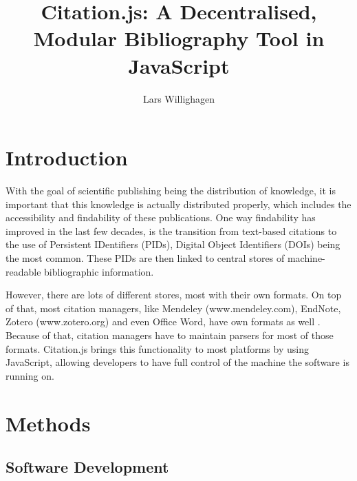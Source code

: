 \documentclass[fleqn,10pt,lineno]{wlpeerj} %
\title{Citation.js: A Decentralised, Modular Bibliography Tool in JavaScript}
\author[1]{Lars Willighagen}
\affil[1]{Eindhoven, The Netherlands}
\begin{document}
\flushbottom
\maketitle
\thispagestyle{empty}

\section*{Introduction}

With the goal of scientific publishing being the distribution of knowledge, it is important that this knowledge is actually distributed properly, which includes the accessibility and findability of these publications. One way findability has improved in the last few decades, is the transition from text-based citations to the use of Persistent IDentifiers (PIDs), Digital Object Identifiers (DOIs) being the most common. These PIDs are then linked to central stores of machine-readable bibliographic information.

However, there are lots of different stores, most with their own formats. On top of that, most citation managers, like Mendeley (www.mendeley.com), EndNote, Zotero (www.zotero.org) and even Office Word, have own formats as well . Because of that, citation managers have to maintain parsers for most of those formats. Citation.js brings this functionality to most platforms by using JavaScript, allowing developers to have full control of the machine the software is running on.


\section*{Methods}

\subsection*{Software Development}
\end{document}
